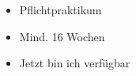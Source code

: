 


\twocolumnsection
{
	\begin{skills}
\end{skills}}{
	\vspace{1em}
	\begin{itemize}
		\item Pflichtpraktikum
		\item Mind. 16 Wochen
		\item Jetzt bin ich verfügbar
	\end{itemize}
}

